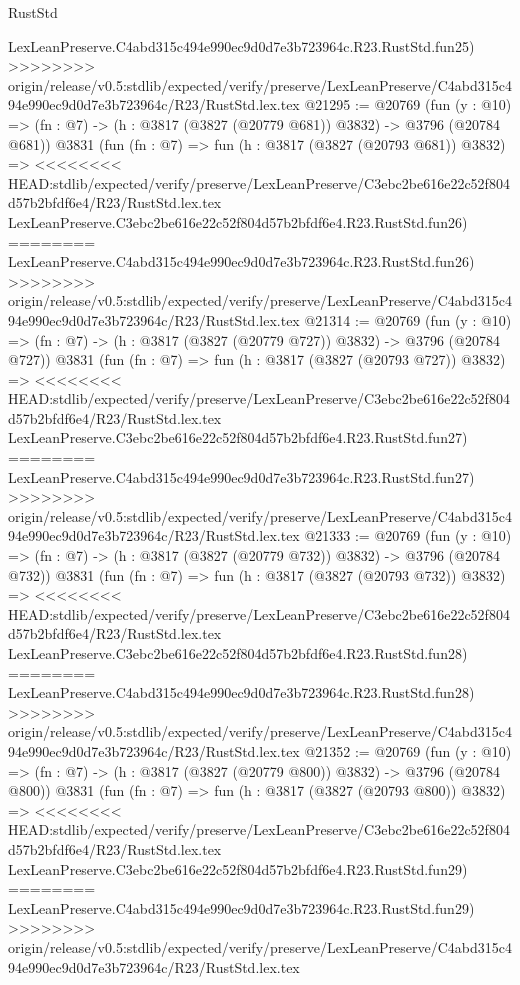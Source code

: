 \begin{lexlean}{RustStd}
\begin{coremodule}
{\begin{coremodule}
{{{{{{{{{{{{{{{{{{{{{{{{{{{{{{{{{{{    LexLeanPreserve.C4abd315c494e990ec9d0d7e3b723964c.R23.RustStd.fun25)
>>>>>>>> origin/release/v0.5:stdlib/expected/verify/preserve/LexLeanPreserve/C4abd315c494e990ec9d0d7e3b723964c/R23/RustStd.lex.tex
@21295 := @20769
    (fun (y : @10) => (fn : @7) -> (h : @3817 (@3827 (@20779 @681)) @3832) -> @3796 (@20784 @681))
    @3831
    (fun (fn : @7) =>
    fun (h : @3817 (@3827 (@20793 @681)) @3832) =>
<<<<<<<< HEAD:stdlib/expected/verify/preserve/LexLeanPreserve/C3ebc2be616e22c52f804d57b2bfdf6e4/R23/RustStd.lex.tex
    LexLeanPreserve.C3ebc2be616e22c52f804d57b2bfdf6e4.R23.RustStd.fun26)
========
    LexLeanPreserve.C4abd315c494e990ec9d0d7e3b723964c.R23.RustStd.fun26)
>>>>>>>> origin/release/v0.5:stdlib/expected/verify/preserve/LexLeanPreserve/C4abd315c494e990ec9d0d7e3b723964c/R23/RustStd.lex.tex
@21314 := @20769
    (fun (y : @10) => (fn : @7) -> (h : @3817 (@3827 (@20779 @727)) @3832) -> @3796 (@20784 @727))
    @3831
    (fun (fn : @7) =>
    fun (h : @3817 (@3827 (@20793 @727)) @3832) =>
<<<<<<<< HEAD:stdlib/expected/verify/preserve/LexLeanPreserve/C3ebc2be616e22c52f804d57b2bfdf6e4/R23/RustStd.lex.tex
    LexLeanPreserve.C3ebc2be616e22c52f804d57b2bfdf6e4.R23.RustStd.fun27)
========
    LexLeanPreserve.C4abd315c494e990ec9d0d7e3b723964c.R23.RustStd.fun27)
>>>>>>>> origin/release/v0.5:stdlib/expected/verify/preserve/LexLeanPreserve/C4abd315c494e990ec9d0d7e3b723964c/R23/RustStd.lex.tex
@21333 := @20769
    (fun (y : @10) => (fn : @7) -> (h : @3817 (@3827 (@20779 @732)) @3832) -> @3796 (@20784 @732))
    @3831
    (fun (fn : @7) =>
    fun (h : @3817 (@3827 (@20793 @732)) @3832) =>
<<<<<<<< HEAD:stdlib/expected/verify/preserve/LexLeanPreserve/C3ebc2be616e22c52f804d57b2bfdf6e4/R23/RustStd.lex.tex
    LexLeanPreserve.C3ebc2be616e22c52f804d57b2bfdf6e4.R23.RustStd.fun28)
========
    LexLeanPreserve.C4abd315c494e990ec9d0d7e3b723964c.R23.RustStd.fun28)
>>>>>>>> origin/release/v0.5:stdlib/expected/verify/preserve/LexLeanPreserve/C4abd315c494e990ec9d0d7e3b723964c/R23/RustStd.lex.tex
@21352 := @20769
    (fun (y : @10) => (fn : @7) -> (h : @3817 (@3827 (@20779 @800)) @3832) -> @3796 (@20784 @800))
    @3831
    (fun (fn : @7) =>
    fun (h : @3817 (@3827 (@20793 @800)) @3832) =>
<<<<<<<< HEAD:stdlib/expected/verify/preserve/LexLeanPreserve/C3ebc2be616e22c52f804d57b2bfdf6e4/R23/RustStd.lex.tex
    LexLeanPreserve.C3ebc2be616e22c52f804d57b2bfdf6e4.R23.RustStd.fun29)
========
    LexLeanPreserve.C4abd315c494e990ec9d0d7e3b723964c.R23.RustStd.fun29)
>>>>>>>> origin/release/v0.5:stdlib/expected/verify/preserve/LexLeanPreserve/C4abd315c494e990ec9d0d7e3b723964c/R23/RustStd.lex.tex
}}}}}}}}}}}}}}}}}}}}}}}}}}}}}}}}}}}
\end{coremodule}}
\end{coremodule}
\end{lexlean}
